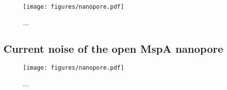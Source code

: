 \begin{figure}[h]
\begin{centering}
\texttt{[image: figures/nanopore.pdf]}
\caption[The ATP molecule in the MspA nanopore]{...}
\label{fig:mspa_atp}
\end{centering}
\end{figure}

\subsection{Current noise of the open MspA nanopore}

\begin{figure}[h]
\begin{centering}
\texttt{[image: figures/nanopore.pdf]}
\caption[Current noise in the MspA nanopore]{...}
\label{fig:mspa_open_noise}
\end{centering}
\end{figure}